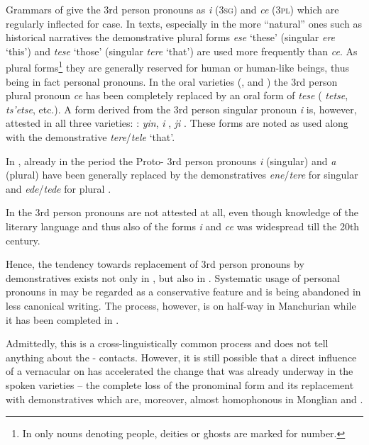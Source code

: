 \documentclass[output=paper,colorlinks,citecolor=brown]{langscibook}
\begin{document}
Grammars of  give the 3rd person pronouns as \textit{i} (3\textsc{sg}) and \textit{ce} (3\textsc{pl}) which are regularly inflected for case. In  texts, especially in the more “natural” ones such as historical narratives the demonstrative plural forms \textit{ese} ‘these’ (singular \textit{ere} ‘this’) and \textit{tese} ‘those’ (singular \textit{tere} ‘that’) are used more frequently than \textit{ce}. As plural forms\footnote{In  only nouns denoting people, deities or ghosts are marked for number.} they are generally reserved for human or human-like beings, thus being in fact personal pronouns. In the oral  varieties (,  and ) the 3rd person plural pronoun \textit{ce} has been completely replaced by an oral form of \textit{tese} (\citealt[52]{WangQingfeng2005Z} \textit{tetse}, \citealt[123]{ZhaoJie1989Z} \textit{ts’etse}, etc.). A form derived from the 3rd  person singular pronoun \textit{i} is, however, attested in all three varieties: : \textit{yin},  \textit{i} \citep[52]{WangQingfeng2005Z},  \textit{ji} \citep[189]{ZhaoJie1989Z}.  These forms are noted as used along with the demonstrative \textit{tere}/\textit{tele} ‘that’.

In , already in the  period the Proto- 3rd person pronouns \textit{i} (singular) and \textit{a} (plural) have been generally replaced by the demonstratives \textit{ene}/\textit{tere} for singular and \textit{ede}/\textit{tede} for plural \citep[72]{Rybatzki2003}.

In  the 3rd person pronouns are not attested at all, even though knowledge of the literary language and thus also of the forms \textit{i} and \textit{ce} was widespread till the 20th century.

Hence, the tendency towards replacement of 3rd person pronouns by demonstratives exists not only in , but also in . Systematic usage of personal pronouns in  may be regarded as a conservative feature and is being abandoned in less canonical  writing. The process, however, is on half-way in Manchurian  while it has been completed in .

Admittedly, this is a cross-linguistically common process and does not tell anything about the - contacts. However, it is still possible that a direct influence of a  vernacular on  has accelerated the change that was already underway in the spoken  varieties -- the complete loss of the  pronominal form and its replacement with demonstratives which are, moreover, almost homophonous in Monglian and .
\end{document}
